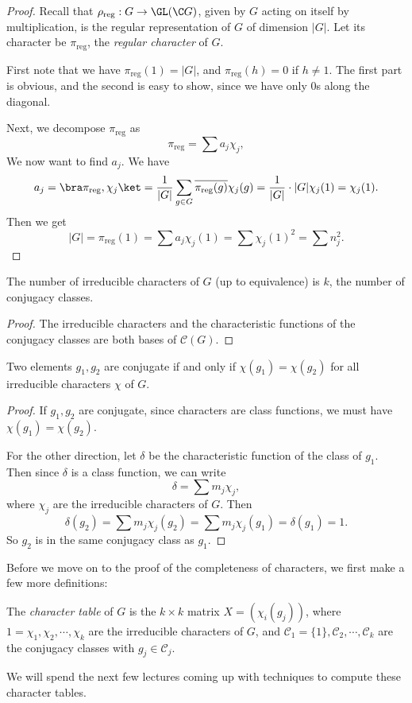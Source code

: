 \documentclass[a4paper]{article}
\begin{document}
\begin{proof}
  Recall that $\rho_{\mathrm{reg}}: G \to \GL(\C G)$, given by $G$ acting on itself by multiplication, is the regular representation of $G$ of dimension $|G|$. Let its character be $\pi_{\mathrm{reg}}$, the \emph{regular character} of $G$.

  First note that we have $\pi_{\mathrm{reg}}(1) = |G|$, and $\pi_{\mathrm{reg}}(h) = 0$ if $h\not= 1$. The first part is obvious, and the second is easy to show, since we have only $0$s along the diagonal.

  Next, we decompose $\pi_{\mathrm{reg}}$ as
  \[
    \pi_{\mathrm{reg}} = \sum a_j \chi_j,
  \]
  We now want to find $a_j$. We have
  \[
    a_j = \bra \pi_{\mathrm{reg}}, \chi_j\ket = \frac{1}{|G|} \sum_{g \in G} \overline{\pi_{\mathrm{reg}}(g)} \chi_j(g) = \frac{1}{|G|} \cdot |G| \chi_j(1) = \chi_j(1).
  \]
  Then we get
  \[
    |G| = \pi_{\mathrm{reg}}(1) = \sum a_j \chi_j(1) = \sum \chi_j(1)^2 = \sum n_j^2.
  \]
\end{proof}

\begin{cor}
  The number of irreducible characters of $G$ (up to equivalence) is $k$, the number of conjugacy classes.
\end{cor}

\begin{proof}
  The irreducible characters and the characteristic functions of the conjugacy classes are both bases of $\mathcal{C}(G)$.
\end{proof}

\begin{cor}
  Two elements $g_1, g_2$ are conjugate if and only if $\chi(g_1) = \chi(g_2)$ for all irreducible characters $\chi$ of $G$.
\end{cor}

\begin{proof}
  If $g_1, g_2$ are conjugate, since characters are class functions, we must have $\chi(g_1) = \chi(g_2)$.

  For the other direction, let $\delta$ be the characteristic function of the class of $g_1$. Then since $\delta$ is a class function, we can write
  \[
    \delta = \sum m_j \chi_j,
  \]
  where $\chi_j$ are the irreducible characters of $G$. Then
  \[
    \delta(g_2) = \sum m_j \chi_j(g_2) = \sum m_j \chi_j(g_1) = \delta(g_1) = 1.
  \]
  So $g_2$ is in the same conjugacy class as $g_1$.
\end{proof}

Before we move on to the proof of the completeness of characters, we first make a few more definitions:
\begin{defi}
  The \emph{character table} of $G$ is the $k \times k$ matrix $X = (\chi_i (g_j))$, where $1 = \chi_1, \chi_2, \cdots, \chi_k$ are the irreducible characters of $G$, and $\mathcal{C}_1 = \{1\}, \mathcal{C}_2, \cdots, \mathcal{C}_k$ are the conjugacy classes with $g_j \in \mathcal{C}_j$.
\end{defi}
We will spend the next few lectures coming up with techniques to compute these character tables.
\end{document}
